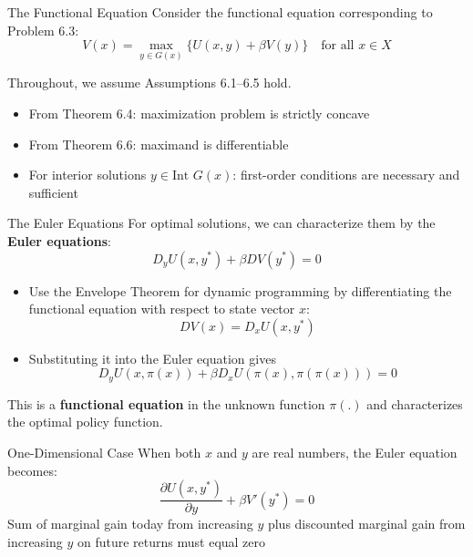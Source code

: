 \documentclass[9pt,aspectratio=169]{beamer}
\begin{document}
\begin{frame}{The Functional Equation}
Consider the functional equation corresponding to Problem 6.3:
\begin{equation*}
V(x) = \max_{y \in G(x)} \{U(x,y) + \beta V(y)\} \quad \text{for all } x \in X
\end{equation*}

Throughout, we assume Assumptions 6.1–6.5 hold.
\begin{itemize}
    \item From Theorem 6.4: maximization problem is strictly concave
    \item From Theorem 6.6: maximand is differentiable
    \item For interior solutions $y \in \text{Int } G(x)$: first-order
    conditions are necessary and sufficient
\end{itemize}
\end{frame}

\begin{frame}{The Euler Equations}
For optimal solutions, we can characterize them by the \textbf{Euler equations}:
\begin{equation*}
D_y U(x, y^*) + \beta DV(y^*) = 0
\end{equation*}

\begin{itemize}
    \item Use the Envelope Theorem for dynamic programming by differentiating
    the functional equation with respect to state vector $x$:
    \begin{equation*}
        DV(x) = D_x U(x, y^*)
    \end{equation*}
    \item Substituting it into the Euler equation gives
    \begin{equation*}
        D_y U(x, \pi(x)) + \beta D_x U(\pi(x), \pi(\pi(x))) = 0
    \end{equation*}
\end{itemize}
This is a \textbf{functional equation} in the unknown function $\pi(.)$ and
characterizes the optimal policy function.
\end{frame}


\begin{frame}{One-Dimensional Case}
    When both $x$ and $y$ are real numbers, the Euler equation becomes:
    \begin{equation*}
        \frac{\partial U(x, y^*)}{\partial y} + \beta V'(y^*) = 0
    \end{equation*}
    Sum of marginal gain today from increasing $y$ plus discounted marginal
    gain from increasing $y$ on future returns must equal zero
\end{frame}
\end{document}
